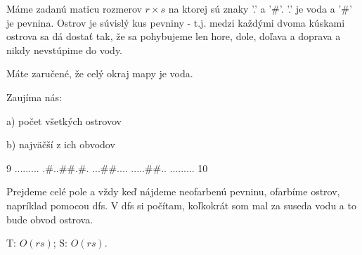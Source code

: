 Máme zadanú maticu rozmerov $r \times s$  na ktorej sú znaky '.' a '\#'. '.' je voda a '\#' je pevnina.
Ostrov je súvislý kus pevniny - t.j. medzi každými dvoma kúskami ostrova sa dá dostať tak, že sa
pohybujeme len hore, dole, doľava a doprava a nikdy nevstúpime do vody.

Máte zaručené, že celý okraj mapy je voda.

Zaujíma nás:

a) počet všetkých ostrovov

b) najväčší z ich obvodov

 9
.........
.\#..\#\#.\#.
...\#\#....
.....\#\#..
.........
10
\koniec

Prejdeme celé pole a vždy keď nájdeme neofarbenú pevninu, ofarbíme ostrov,
napríklad pomocou dfs. V dfs si počítam, koľkokrát som mal za suseda 
vodu a to bude obvod ostrova.

T: $O(rs)$; S: $O(rs)$.

